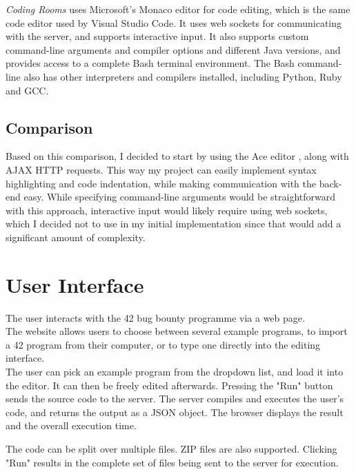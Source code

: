 \emph{Coding Rooms} \cite{coding-rooms-2022} uses Microsoft's Monaco editor for code editing, which is the same code editor used by Visual Studio Code. It uses web sockets for communicating with the server, and supports interactive input. It also supports custom command-line arguments and compiler options and different Java versions, and provides access to a complete Bash terminal environment. The Bash command-line also has other interpreters and compilers installed, including Python, Ruby and GCC.


\section{Comparison}


Based on this comparison, I decided to start by using the Ace editor \cite{mozilla-2022}, along with AJAX HTTP requests. This way my project can easily implement syntax highlighting and code indentation, while making communication with the back-end easy. While specifying command-line arguments would be straightforward with this approach, interactive input would likely require using web sockets, which I decided not to use in my initial implementation since that would add a significant amount of complexity.

\chapter{User Interface}

The user interacts with the 42 bug bounty programme via a web page.
\\[12pt]
The website allows users to choose between several example programs, to import a 42 program from their computer, or to type one directly into the editing interface.
\\[12pt]
The user can pick an example program from the dropdown list, and load it into the editor. It can then be freely edited afterwards. Pressing the "Run" button sends the source code to the server. The server compiles and executes the user's code, and returns the output as a JSON object. The browser displays the result and the overall execution time.


The code can be split over multiple files. ZIP files are also supported. Clicking "Run" results in the complete set of files being sent to the server for execution.

